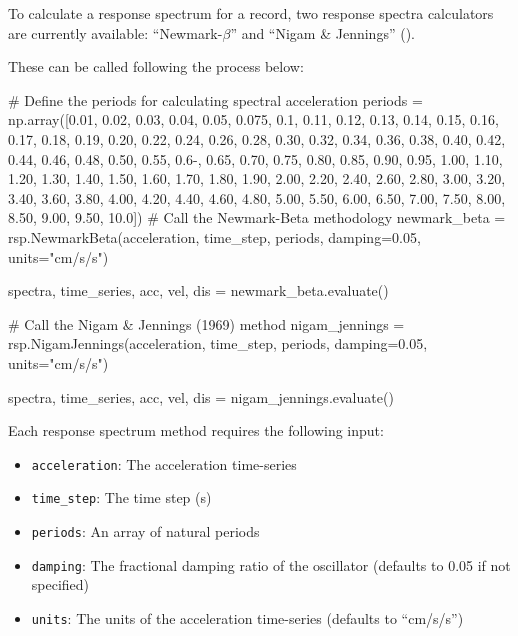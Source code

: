 To calculate a response spectrum for a record, two response spectra calculators are currently available: ``Newmark-$\beta$'' and ``Nigam \& Jennings'' (\cite{NigamJennings1969}).

These can be called following the process below:
\begin{python}
# Define the periods for calculating spectral acceleration
periods = np.array([0.01, 0.02, 0.03, 0.04, 0.05, 0.075, 0.1, 
                    0.11, 0.12, 0.13, 0.14, 0.15, 0.16, 0.17, 
                    0.18, 0.19, 0.20, 0.22, 0.24, 0.26, 0.28,
                    0.30, 0.32, 0.34, 0.36, 0.38, 0.40, 0.42,
                    0.44, 0.46, 0.48, 0.50, 0.55, 0.6-, 0.65,
                    0.70, 0.75, 0.80, 0.85, 0.90, 0.95, 1.00,
                    1.10, 1.20, 1.30, 1.40, 1.50, 1.60, 1.70, 
                    1.80, 1.90, 2.00, 2.20, 2.40, 2.60, 2.80, 
                    3.00, 3.20, 3.40, 3.60, 3.80, 4.00, 4.20,
                    4.40, 4.60, 4.80, 5.00, 5.50, 6.00, 6.50, 
                    7.00, 7.50, 8.00, 8.50, 9.00, 9.50, 10.0])
# Call the Newmark-Beta methodology
newmark_beta = rsp.NewmarkBeta(acceleration,
                               time_step,
                               periods,
                               damping=0.05,
                               units="cm/s/s")

spectra, time_series, acc, vel, dis = newmark_beta.evaluate()

# Call the Nigam & Jennings (1969) method
nigam_jennings = rsp.NigamJennings(acceleration,
                                   time_step,
                                   periods,
                                   damping=0.05,
                                   units="cm/s/s")

spectra, time_series, acc, vel, dis = nigam_jennings.evaluate()
\end{python}

Each response spectrum method requires the following input:
\begin{itemize}
\item \verb=acceleration=: The acceleration time-series
\item \verb=time_step=: The time step (s)
\item \verb=periods=: An array of natural periods
\item \verb=damping=: The fractional damping ratio of the oscillator (defaults to 0.05 if not specified)
\item \verb=units=: The units of the acceleration time-series (defaults to ``cm/s/s'')
\end{itemize}

